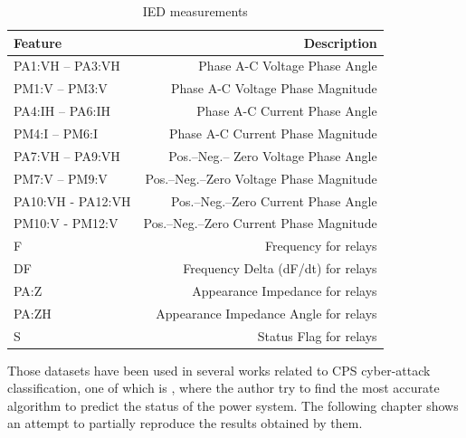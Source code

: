 \begin{table}[H]
    \centering
    \caption[IED measurements]{IED measurements \cite{adhikari_power_2014}} \label{tab:pmu_mes}
    \begin{tabular}{lr}
        \toprule
        Feature&Description \\
        \midrule
        PA1:VH – PA3:VH&Phase A-C Voltage Phase Angle \\
        PM1:V – PM3:V&Phase A-C Voltage Phase Magnitude \\
        PA4:IH – PA6:IH&Phase A-C Current Phase Angle \\
        PM4:I – PM6:I&Phase A-C Current Phase Magnitude \\
        PA7:VH – PA9:VH&Pos.–Neg.– Zero Voltage Phase Angle \\
        PM7:V – PM9:V&Pos.–Neg.–Zero Voltage Phase Magnitude \\
        PA10:VH - PA12:VH&Pos.–Neg.–Zero Current Phase Angle \\
        PM10:V - PM12:V&Pos.–Neg.–Zero Current Phase Magnitude \\
        F&Frequency for relays \\
        DF&Frequency Delta (dF/dt) for relays \\
        PA:Z&Appearance Impedance for relays \\
        PA:ZH&Appearance Impedance Angle for relays \\
        S&Status Flag for relays \\
        \bottomrule
    \end{tabular}
\end{table} 


Those datasets have been used in several works related to CPS cyber-attack classification, one of which is \cite{borges_hink_machine_2014-1}, where the author try to find the most accurate algorithm to predict the status of the power system. The following chapter shows an attempt to partially reproduce the results obtained by them.


